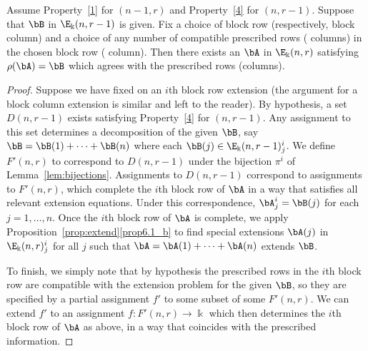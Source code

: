 \begin{lemm}\label{lem:partial}
Assume Property~\ref{1} for $(n-1,r)$ and Property~\ref{4} for
$(n,r-1)$. Suppose that $\bB$ in $\E_\Bbbk(n,r-1)$ is given. Fix a
choice of block row \textup{(}respectively, block column\textup{)} and
a choice of any number of compatible prescribed rows \textup{(}\resp
columns\textup{)} in the chosen block row \textup{(}\resp
column\textup{)}. Then there exists an $\bA$ in $\E_\Bbbk(n,r)$
satisfying $\rho(\bA)=\bB$ which agrees with the prescribed rows
\textup{(}\resp columns\textup{)}.
\end{lemm}

\begin{proof}
Suppose we have fixed on an $i$th block row extension (the argument
for a block column extension is similar and left to the reader). By
hypothesis, a set $D(n,r-1)$ exists satisfying Property~\ref{4} for
$(n,r-1)$. Any assignment to this set determines a decomposition of
the given $\bB$, say $\bB = \bB(1)+ \cdots + \bB(n)$ where each
$\bB(j) \in \E_\Bbbk(n,r-1)^i_j$. We define $F'(n,r)$ to correspond
to $D(n,r-1)$ under the bijection $\pi^i$ of Lemma~\ref{lem:bijections}. Assignments to $D(n,r-1)$ correspond to
assignments to $F'(n,r)$, which complete the $i$th block row of $\bA$
in a way that satisfies all relevant extension equations. Under this
correspondence, $\bA^i_j = \bB(j)$ for each $j=1,\dots,n$. Once the
$i$th block row of $\bA$ is complete, we apply Proposition~\ref{prop:extend}\ref{prop6.1_b} to find special extensions $\bA(j)$ in $\E_\Bbbk(n,r)^i_j$ for all $j$ such that $\bA=\bA(1)+ \cdots +
\bA(n)$ extends $\bB$.

To finish, we simply note that by hypothesis the prescribed rows in
the $i$th block row are compatible with the extension problem for the
given $\bB$, so they are specified by a partial assignment $f'$ to
some subset of some $F'(n,r)$. We can extend $f'$ to an assignment
$f:F'(n,r)\to \Bbbk$ which then determines the $i$th block row of
$\bA$ as above, in a way that coincides with the prescribed
information.
\end{proof}



